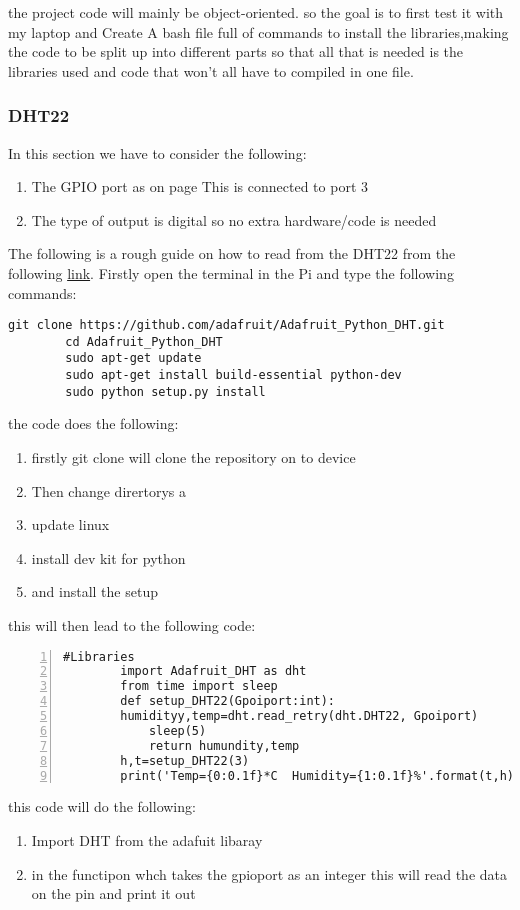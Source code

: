 	the project code will mainly be object-oriented. so the goal is to first test it with my laptop and  Create A bash file  full of  commands to install  the libraries,making the code to be split up  into  different parts so that all that is needed is the libraries used and code that won't all have to  compiled in one file.

	\subsubsection{DHT22}
	In this section we have to consider the following: 
	\begin{enumerate}
		\item The GPIO port as on page \pageref{Sychematic for DHT22 revised} This is connected to port 3 
		\item The type of output is digital so no  extra hardware/code is needed
	\end{enumerate}

	The following is  a rough guide on how to read from the DHT22 from the following \href{https://www.instructables.com/Raspberry-Pi-Tutorial-How-to-Use-the-DHT-22/}{link}.
	Firstly open the terminal in the Pi and
	type the following commands:
	\begin{lstlisting}[style=bashstyle]
		git clone https://github.com/adafruit/Adafruit_Python_DHT.git
		cd Adafruit_Python_DHT
		sudo apt-get update
		sudo apt-get install build-essential python-dev
		sudo python setup.py install
	\end{lstlisting}
	the code does the following:
	\begin{enumerate}
		\item firstly git clone will clone the  repository on to device
		\item Then change dirertorys  a
		\item update linux
		\item install dev kit for  python 
		\item and install the setup 
	\end{enumerate}
	
	\newpage
	this will then lead to  the  following code:
	\begin{lstlisting}[style=mystyle,caption={Example code for DHT2},numbers=left,firstnumber=1]
		#Libraries
		import Adafruit_DHT as dht
		from time import sleep
		def setup_DHT22(Gpoiport:int):
		humidityy,temp=dht.read_retry(dht.DHT22, Gpoiport)
			sleep(5)
			return humundity,temp
		h,t=setup_DHT22(3)
		print('Temp={0:0.1f}*C  Humidity={1:0.1f}%'.format(t,h))
	\end{lstlisting}
	this code will do the following:
	\begin{enumerate}
		\item Import DHT from the adafuit libaray
		\item in the  functipon whch takes the gpioport  as an integer this will read the data on the pin and  print it  out
	\end{enumerate}
	
